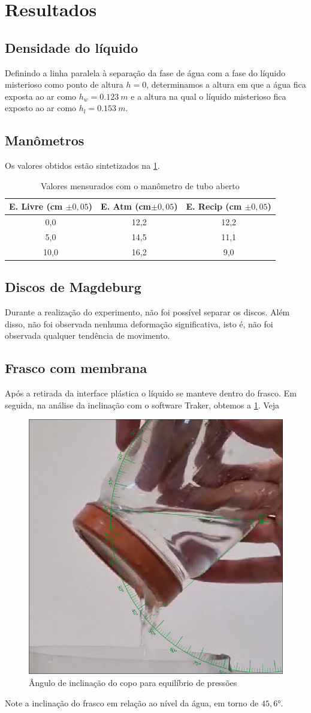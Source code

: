\section{Resultados}
\subsection{Densidade do líquido}
Definindo a linha paralela à separação da fase de água com a fase do líquido
misterioso como ponto de altura \(h = 0\), determinamos a altura em que a
água fica exposta ao ar como \(h_w = \qty{0,123}{m}\) e a altura na qual o
líquido misterioso fica exposto ao ar como \(h_l = \qty{0,153}{m}\). 

\subsection{Manômetros}
Os valores obtidos estão sintetizados na \cref{tab_man}.

\begin{table}[H]
    \centering
    \begin{tabular}{c | c | c}
        \hline
        \textbf{E. Livre (cm \(\pm 0,05\))} & \textbf{E. Atm (cm\(\pm 0,05\))} & \textbf{E. Recip (cm \(\pm0,05\))}\\
        \hline
        0,0 & 12,2 & 12,2\\
        \hline
        5,0 & 14,5 & 11,1\\
        \hline
        10,0 & 16,2 & 9,0\\
        \hline
    \end{tabular}
    \caption{Valores mensurados com o manômetro de tubo aberto}
    \label{tab_man}
\end{table}

\subsection{Discos de Magdeburg}
Durante a realização do experimento, não foi possível separar os discos. Além
disso, não foi observada nenhuma deformação significativa, isto é, não foi
observada qualquer tendência de movimento. 

\subsection{Frasco com membrana}
Após a retirada da interface plástica o líquido se manteve dentro do frasco. Em
seguida, na análise da inclinação com o software Traker, obtemos a \cref{copo.png}. Veja
\begin{figure}[H]
    \centering
    \includegraphics[width=.35\linewidth]{fig/copo.png}
    \caption{Ângulo de inclinação do copo para equilíbrio de pressões}
    \label{copo.png}
\end{figure}

Note a inclinação do frasco em relação ao nível da água, em torno de \( 45,6 \)°.

